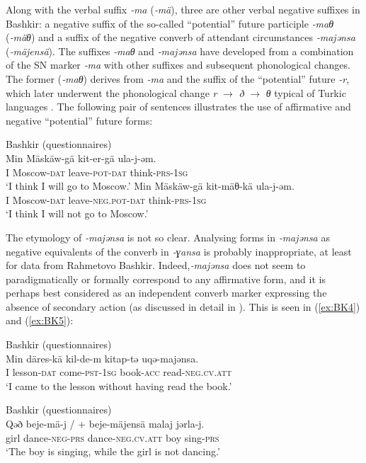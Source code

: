 \documentclass[output=paper]{langsci/langscibook}
\begin{document}
Along with the verbal suffix \textit{‑ma} (\textit{‑mä}), three are other verbal negative suffixes in Bashkir: a negative suffix of the so-called “potential” future \citep[148]{dmitriev1948a} participle \textit{‑maθ} (\textit{‑mäθ}) and a suffix of the negative converb of attendant circumstances \textit{‑majənsa} (\textit{‑mäjensä}). The suffixes \textit{‑maθ} and \textit{‑majənsa} have developed from a combination of the SN marker \textit{‑ma} with other suffixes and subsequent phonological changes. The former (\textit{‑maθ}) derives from \textit{-ma} and the suffix of the “potential” future \textit{-r}, which later underwent the phonological change \textit{r} $\rightarrow$ \textit{ð} $\rightarrow$ \textit{θ} typical of Turkic languages \citep[149]{dmitriev1948a}. The following pair of sentences illustrates the use of affirmative and negative “potential” future forms:

\ea Bashkir (questionnaires) \label{ex:BK3}\\
  \ea
	\gll Min	Mäskäw-gä		kit-er-gä			ula-j-əm.\\
	I		Moscow-\textsc{dat}	leave-\textsc{pot-dat}	think-\textsc{prs-1sg}\\
	\glt `I think I will go to Moscow.'
  \ex
	\gll Min	Mäskäw-gä		kit-mäθ-kä				ula-j-əm.\\
	I		Moscow-\textsc{dat}	leave-\textsc{neg.pot-dat}	think-\textsc{prs-1sg}\\
	\glt `I think I will not go to Moscow.'
\z \z

The etymology of \textit{‑majənsa} is not so clear. Analysing forms in \textit{‑majənsa} as negative equivalents of the converb in \textit{‑ɣansa} \citep[188]{dmitriev1948a} is probably inappropriate, at least for data from Rahmetovo Bashkir. Indeed,\textit{‑majənsa} does not seem to paradigmatically or formally correspond to any affirmative form, and it is perhaps best considered as an independent converb marker expressing the absence of secondary action (as discussed in detail in \citealp{mishchenko2011a}). This is seen in (\ref{ex:BK4}) and (\ref{ex:BK5}):

\ea Bashkir (questionnaires) \label{ex:BK4}\\
	\gll Min	däres-kä		kil-de-m			kitap-tǝ    uqə-majənsa.\\
	I		lesson-\textsc{dat}	come-\textsc{pst-1sg}	book-\textsc{acc}    read-\textsc{neg.cv.att}\\
	\glt `I came to the lesson without having read the book.'
\z

\ea Bashkir (questionnaires) \label{ex:BK5}\\
	\gll Qəð	beje-mä-j			{/ + beje-mäjensä}		malaj	jərla-j.\\
	girl		dance-\textsc{neg-prs}	dance-\textsc{neg.cv.att}	boy	sing-\textsc{prs}\\
	\glt `The boy is singing, while the girl is not dancing.'
\z
\end{document}
